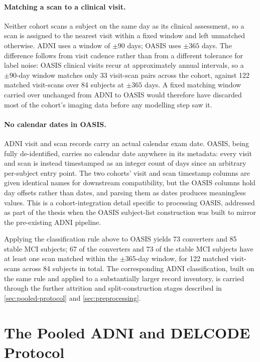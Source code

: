 \paragraph{Matching a scan to a clinical visit.} Neither cohort scans a subject on the same
day as its clinical assessment, so a scan is assigned to the nearest visit within a fixed
window and left unmatched otherwise. \ac{ADNI} uses a window of $\pm 90$ days; \ac{OASIS}
uses $\pm 365$ days. The difference follows from visit cadence rather than from a different
tolerance for label noise: \ac{OASIS} clinical visits recur at approximately annual
intervals, so a $\pm 90$-day window matches only 33 visit-scan pairs across the cohort,
against 122 matched visit-scans over 84 subjects at $\pm 365$ days. A fixed matching window
carried over unchanged from \ac{ADNI} to \ac{OASIS} would therefore have discarded most of
the cohort's imaging data before any modelling step saw it.

\paragraph{No calendar dates in \ac{OASIS}.} \ac{ADNI} visit and scan records carry an
actual calendar exam date. \ac{OASIS}, being fully de-identified, carries no calendar date
anywhere in its metadata: every visit and scan is instead timestamped as an integer count
of days since an arbitrary per-subject entry point. The two cohorts' visit and scan
timestamp columns are given identical names for downstream compatibility, but the
\ac{OASIS} columns hold day offsets rather than dates, and parsing them as dates produces
meaningless values. This is a cohort-integration detail specific to processing \ac{OASIS},
addressed as part of the thesis when the \ac{OASIS} subject-list construction was built to
mirror the pre-existing \ac{ADNI} pipeline.

Applying the classification rule above to \ac{OASIS} yields 73 converters and 85 stable
\ac{MCI} subjects; 67 of the converters and 73 of the stable \ac{MCI} subjects have at
least one scan matched within the $\pm 365$-day window, for 122 matched visit-scans across
84 subjects in total. The corresponding \ac{ADNI} classification, built on the same rule
and applied to a substantially larger record inventory, is carried through the further
attrition and split-construction stages described in \autoref{sec:pooled-protocol} and
\autoref{sec:preprocessing}.

\section{The Pooled ADNI and DELCODE Protocol}\label{sec:pooled-protocol}

